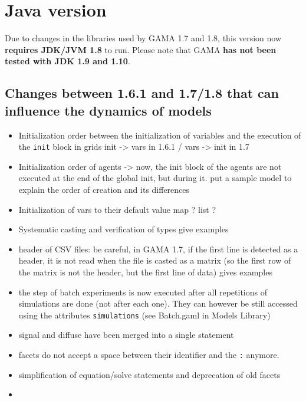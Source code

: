 \documentclass[]{book}
\providecommand{\tightlist}{%
  \setlength{\itemsep}{0pt}\setlength{\parskip}{0pt}}
\theoremstyle{definition}
\theoremstyle{definition}
\theoremstyle{definition}
\theoremstyle{remark}
\begin{document}
\chapter{Java version}\label{java-version}

Due to changes in the libraries used by GAMA 1.7 and 1.8, this version
now \textbf{requires JDK/JVM 1.8} to run. Please note that GAMA
\textbf{has not been tested with JDK 1.9 and 1.10}.

\section{Changes between 1.6.1 and 1.7/1.8 that can influence the
dynamics of
models}\label{changes-between-1.6.1-and-1.71.8-that-can-influence-the-dynamics-of-models}

\begin{itemize}
\tightlist
\item
  Initialization order between the initialization of variables and the
  execution of the \texttt{init} block in grids init -\textgreater{}
  vars in 1.6.1 / vars -\textgreater{} init in 1.7
\item
  Initialization order of agents -\textgreater{} now, the init block of
  the agents are not executed at the end of the global init, but during
  it. put a sample model to explain the order of creation and its
  differences
\item
  Initialization of vars to their default value map ? list ?
\item
  Systematic casting and verification of types give examples
\item
  header of CSV files: be careful, in GAMA 1.7, if the first line is
  detected as a header, it is not read when the file is casted as a
  matrix (so the first row of the matrix is not the header, but the
  first line of data) gives examples
\item
  the step of batch experiments is now executed after all repetitions of
  simulations are done (not after each one). They can however be still
  accessed using the attributes \texttt{simulations} (see Batch.gaml in
  Models Library)
\item
  signal and diffuse have been merged into a single statement
\item
  facets do not accept a space between their identifier and the
  \texttt{:} anymore.
\item
  simplification of equation/solve statements and deprecation of old
  facets
\item

\end{itemize}
\end{document}
